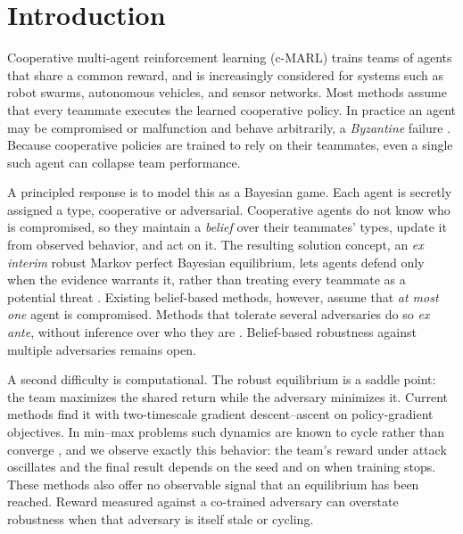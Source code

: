 \section{Introduction}
\label{sec:intro}

Cooperative multi-agent reinforcement learning (c-MARL) trains teams of agents
that share a common reward, and is increasingly considered for systems such as
robot swarms, autonomous vehicles, and sensor networks. Most methods assume that
every teammate executes the learned cooperative policy. In practice an agent may
be compromised or malfunction and behave arbitrarily, a \emph{Byzantine} failure
\citep{lamport1982byzantine}. Because cooperative policies are trained to rely on
their teammates, even a single such agent can collapse team performance.

A principled response is to model this as a Bayesian game. Each agent is secretly
assigned a type, cooperative or adversarial. Cooperative agents do not know who is
compromised, so they maintain a \emph{belief} over their teammates' types, update
it from observed behavior, and act on it. The resulting solution concept, an
\emph{ex interim} robust Markov perfect Bayesian equilibrium, lets agents defend
only when the evidence warrants it, rather than treating every teammate as a
potential threat \citep{li2024byzantine,kazari2026bayesian}. Existing belief-based
methods, however, assume that \emph{at most one} agent is compromised. Methods that
tolerate several adversaries do so \emph{ex ante}, without inference over who they
are \citep{phan2021radar}. Belief-based robustness against multiple adversaries
remains open.

A second difficulty is computational. The robust equilibrium is a saddle point:
the team maximizes the shared return while the adversary minimizes it. Current
methods find it with two-timescale gradient descent--ascent on policy-gradient
objectives. In min--max problems such dynamics are known to cycle rather than
converge \citep{mertikopoulos2018cycles}, and we observe exactly this behavior: the
team's reward under attack oscillates and the final result depends on the seed and
on when training stops. These methods also offer no observable signal that an
equilibrium has been reached. Reward measured against a co-trained adversary can
overstate robustness when that adversary is itself stale or cycling.


